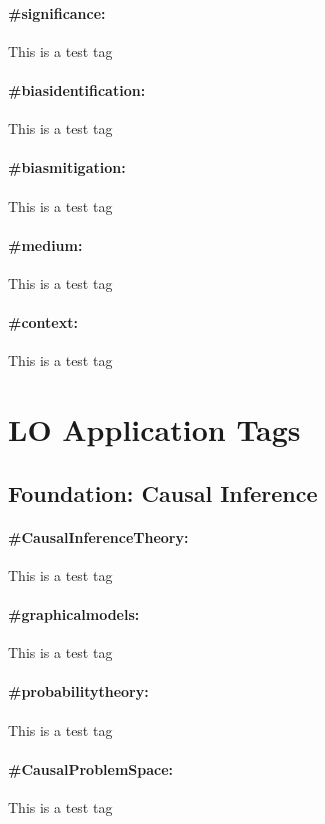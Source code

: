 \documentclass[./main.tex]{subfiles}
\begin{document}
\paragraph*{\textbf{\#significance:}}\label{hc:significance} This is a test tag
\paragraph*{\textbf{\#biasidentification:}}\label{hc:biasidentification} This is a test tag
\paragraph*{\textbf{\#biasmitigation:}}\label{hc:biasmitigation} This is a test tag
\paragraph*{\textbf{\#medium:}}\label{hc:medium} This is a test tag
\paragraph*{\textbf{\#context:}}\label{hc:context} This is a test tag

\section{LO Application Tags}

\subsection{Foundation: Causal Inference}
\paragraph*{\textbf{\#CausalInferenceTheory:}}\label{lo:CausalInferenceTheory} This is a test tag
\paragraph*{\textbf{\#graphicalmodels:}}\label{lo:graphicalmodels} This is a test tag
\paragraph*{\textbf{\#probabilitytheory:}}\label{lo:probabilitytheory} This is a test tag
\paragraph*{\textbf{\#CausalProblemSpace:}}\label{lo:CausalProblemSpace} This is a test tag
\end{document}
